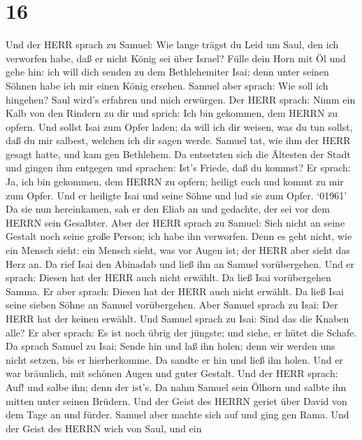 \hypertarget{section-15}{%
\section{16}\label{section-15}}

 Und der HERR sprach zu Samuel: Wie lange trägst du Leid um
Saul, den ich verworfen habe, daß er nicht König sei über Israel? Fülle
dein Horn mit Öl und gehe hin: ich will dich senden zu dem Bethlehemiter
Isai; denn unter seinen Söhnen habe ich mir einen König ersehen.
 Samuel aber sprach: Wie soll ich hingehen? Saul wird's
erfahren und mich erwürgen. Der HERR sprach: Nimm ein Kalb von den
Rindern zu dir und sprich: Ich bin gekommen, dem HERRN zu opfern.
 Und sollst Isai zum Opfer laden; da will ich dir weisen,
was du tun sollst, daß du mir salbest, welchen ich dir sagen werde.
 Samuel tat, wie ihm der HERR gesagt hatte, und kam gen
Bethlehem. Da entsetzten sich die Ältesten der Stadt und gingen ihm
entgegen und sprachen: Ist's Friede, daß du kommst?  Er
sprach: Ja, ich bin gekommen, dem HERRN zu opfern; heiligt euch und
kommt zu mir zum Opfer. Und er heiligte Isai und seine Söhne und lud sie
zum Opfer.  `01961' Da sie nun hereinkamen, sah er den Eliab
an und gedachte, der sei vor dem HERRN sein Gesalbter.  Aber
der HERR sprach zu Samuel: Sieh nicht an seine Gestalt noch seine große
Person; ich habe ihn verworfen. Denn es geht nicht, wie ein Mensch
sieht: ein Mensch sieht, was vor Augen ist; der HERR aber sieht das Herz
an.  Da rief Isai den Abinadab und ließ ihn an Samuel
vorübergehen. Und er sprach: Diesen hat der HERR auch nicht erwählt.
 Da ließ Isai vorübergehen Samma. Er aber sprach: Diesen hat
der HERR auch nicht erwählt.  Da ließ Isai seine sieben
Söhne an Samuel vorübergehen. Aber Samuel sprach zu Isai: Der HERR hat
der keinen erwählt.  Und Samuel sprach zu Isai: Sind das
die Knaben alle? Er aber sprach: Es ist noch übrig der jüngste; und
siehe, er hütet die Schafe. Da sprach Samuel zu Isai; Sende hin und laß
ihn holen; denn wir werden uns nicht setzen, bis er hierherkomme.
 Da sandte er hin und ließ ihn holen. Und er war bräunlich,
mit schönen Augen und guter Gestalt. Und der HERR sprach: Auf! und salbe
ihn; denn der ist's.  Da nahm Samuel sein Ölhorn und salbte
ihn mitten unter seinen Brüdern. Und der Geist des HERRN geriet über
David von dem Tage an und fürder. Samuel aber machte sich auf und ging
gen Rama.  Und der Geist des HERRN wich von Saul, und ein
